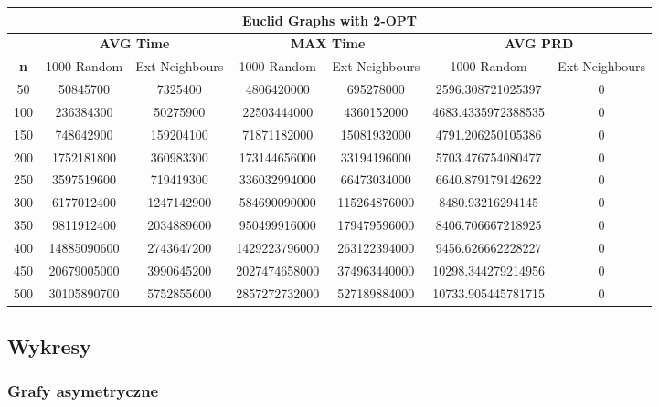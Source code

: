 \documentclass{article}
\begin{document}
\begin{center}
\begin{tabular}{|c|c|c|c|c|c|c|}
\hline
\multicolumn{7}{|c|}{\textbf{Euclid Graphs with 2-OPT}}\\
\hline
 & \multicolumn{2}{|c|}{\textbf{AVG Time}} & \multicolumn{2}{|c|}{\textbf{MAX Time}} & \multicolumn{2}{|c|}{\textbf{AVG PRD}}\\
\hline
\textbf{n} & 1000-Random & Ext-Neighbours & 1000-Random & Ext-Neighbours & 1000-Random & Ext-Neighbours\\
\hline
50 & 50845700 & 7325400 & 4806420000 & 695278000 & 2596.308721025397 & 0\\
\hline
100 & 236384300 & 50275900 & 22503444000 & 4360152000 & 4683.4335972388535 & 0\\
\hline
150 & 748642900 & 159204100 & 71871182000 & 15081932000 & 4791.206250105386 & 0\\
\hline
200 & 1752181800 & 360983300 & 173144656000 & 33194196000 & 5703.476754080477 & 0\\
\hline
250 & 3597519600 & 719419300 & 336032994000 & 66473034000 & 6640.879179142622 & 0\\
\hline
300 & 6177012400 & 1247142900 & 584690090000 & 115264876000 & 8480.93216294145 & 0\\
\hline
350 & 9811912400 & 2034889600 & 950499916000 & 179479596000 & 8406.706667218925 & 0\\
\hline
400 & 14885090600 & 2743647200 & 1429223796000 & 263122394000 & 9456.626662228227 & 0\\
\hline
450 & 20679005000 & 3990645200 & 2027474658000 & 374963440000 & 10298.344279214956 & 0\\
\hline
500 & 30105890700 & 5752855600 & 2857272732000 & 527189884000 & 10733.905445781715 & 0\\
\hline
\end{tabular}
\end{center}



\subsection{Wykresy}

\subsubsection{Grafy asymetryczne}
\end{document}

